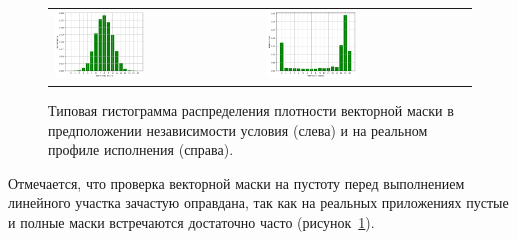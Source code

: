 \documentclass[a4paper,14pt]{extarticle}                     %
\theoremstyle{plain}                                         %
\begin{document}
\begin{figure}[ht]
\centering
\begin{tabular}{ll}
\includegraphics[width=0.45\textwidth]{./pics/text_4_vec_comb_mask/independent_p.png}
&
\includegraphics[width=0.45\textwidth]{./pics/text_4_vec_comb_mask/real_p.png}
\end{tabular}
\singlespacing
{}\caption{Типовая гистограмма распределения плотности векторной маски в предположении независимости условия (слева) и на реальном профиле исполнения (справа).}
\label{fig:text_4_vec_comb_mask_independent_p}
\end{figure}

Отмечается, что проверка векторной маски на пустоту перед выполнением линейного участка зачастую оправдана, так как на реальных приложениях пустые и полные маски встречаются достаточно часто (рисунок~\ref{fig:text_4_vec_comb_mask_independent_p}).

\end{document}
